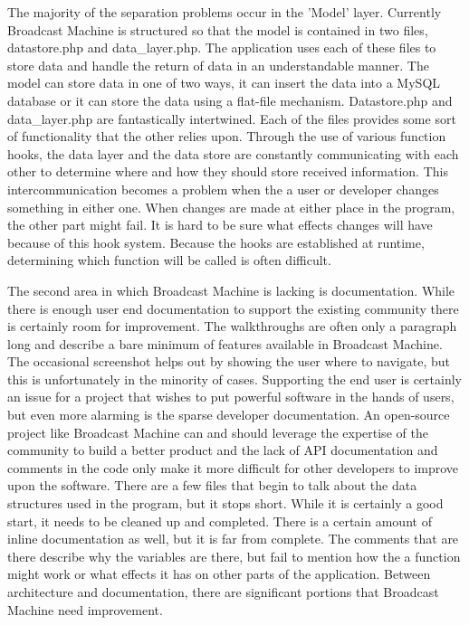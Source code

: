 \documentclass[a4paper,12pt]{report}
\begin{document}
The majority of the separation problems occur in the 'Model' layer.
Currently Broadcast Machine is structured so that the model is contained in two files, datastore.php and data\_layer.php.
The application uses each of these files to store data and handle the return of data in an understandable manner.
The model can store data in one of two ways, it can insert the data into a MySQL database or it can store the data using a flat-file mechanism.
Datastore.php and data\_layer.php are fantastically intertwined.
Each of the files provides some sort of functionality that the other relies upon.
Through the use of various function hooks, the data layer and the data store are constantly communicating with each other to determine where and how they should store received information.
This intercommunication becomes a problem when the a user or developer changes something in either one.
When changes are made at either place in the program, the other part might fail.
It is hard to be sure what effects changes will have because of this hook system.
Because the hooks are established at runtime, determining which function will be called is often difficult.


The second area in which Broadcast Machine is lacking is documentation.
While there is enough user end documentation to support the existing community there is certainly room for improvement.
The walkthroughs are often only a paragraph long and describe a bare minimum of features available in Broadcast Machine.
The occasional screenshot helps out by showing the user where to navigate, but this is unfortunately in the minority of cases.
Supporting the end user is certainly an issue for a project that wishes to put powerful software in the hands of users, but even more alarming is the sparse developer documentation.
An open-source project like Broadcast Machine can and should leverage the expertise of the community to build a better product and the lack of API documentation and comments in the code only make it more difficult for other developers to improve upon the software.
There are a few files that begin to talk about the data structures used in the program, but it stops short.
While it is certainly a good start, it needs to be cleaned up and completed. There is a certain amount of inline documentation as well, but it is far from complete.
The comments that are there describe why the variables are there, but fail to mention how the a function might work or what effects it has on other parts of the application.
Between architecture and documentation, there are significant portions that Broadcast Machine need improvement.
\end{document}

